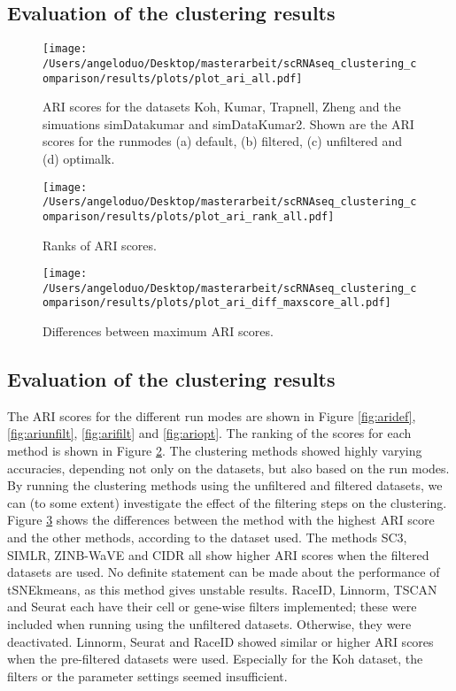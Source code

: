 \documentclass[12pt, a4paper]{article}\usepackage[]{graphicx}\usepackage[]{color}
\begin{document}
\subsection{Evaluation of the clustering results}
\begin{figure}[!h]
\texttt{[image: /Users/angeloduo/Desktop/masterarbeit/scRNAseq\_clustering\_comparison/results/plots/plot\_ari\_all.pdf]}
\caption{ARI scores for the datasets Koh, Kumar, Trapnell, Zheng and the simuations simDatakumar and simDataKumar2. Shown are the ARI scores for the runmodes (a) default, (b) filtered, (c) unfiltered and (d) optimalk. }
\label{fig:ariall}
\end{figure}

\begin{figure}[!h]
\texttt{[image: /Users/angeloduo/Desktop/masterarbeit/scRNAseq\_clustering\_comparison/results/plots/plot\_ari\_rank\_all.pdf]}
\caption{Ranks of ARI scores.  }
\label{fig:arirank}
\end{figure}



\begin{figure}[!h]
\texttt{[image: /Users/angeloduo/Desktop/masterarbeit/scRNAseq\_clustering\_comparison/results/plots/plot\_ari\_diff\_maxscore\_all.pdf]}
\caption{Differences between maximum ARI scores.  }
\label{fig:aridiff1}
\end{figure}


\subsection{Evaluation of the clustering results}

The ARI scores for the different run modes are shown in Figure \ref{fig:aridef}, \ref{fig:ariunfilt}, \ref{fig:arifilt} and \ref{fig:ariopt}. The ranking of the scores for each method is shown in Figure \ref{fig:arirank}. The clustering methods showed highly varying accuracies, depending not only on the datasets, but also based on the run modes.  By running the clustering methods using the unfiltered and filtered datasets, we can (to some extent) investigate the effect of the filtering steps on the clustering. Figure \ref{fig:aridiff1} shows the differences between the method with the highest ARI score and the other methods, according to the dataset used. The methods SC3, SIMLR, ZINB-WaVE and CIDR all show higher ARI scores when the filtered datasets are used. No definite statement can be made about the performance of tSNEkmeans, as this method gives unstable results. RaceID, Linnorm, TSCAN and Seurat each have their cell or gene-wise filters implemented; these were included when running using the unfiltered datasets. Otherwise, they were deactivated. Linnorm, Seurat and RaceID showed similar or higher ARI scores when the pre-filtered datasets were used. Especially for the Koh dataset, the filters or the parameter settings seemed insufficient. 
\end{document}
